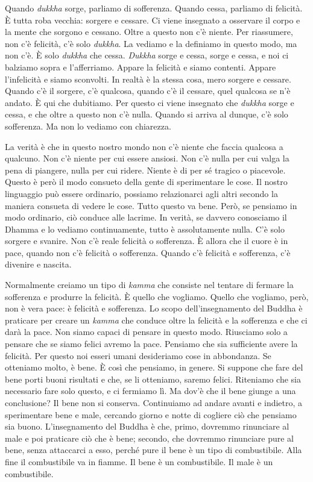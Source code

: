 Quando \emph{dukkha} sorge, parliamo di sofferenza. Quando cessa,
parliamo di felicità. È tutta roba vecchia: sorgere e cessare. Ci viene
insegnato a osservare il corpo e la mente che sorgono e cessano. Oltre a
questo non c'è niente. Per riassumere, non c'è felicità, c'è solo
\emph{dukkha}. La vediamo e la definiamo in questo modo, ma non c'è. È
solo \emph{dukkha} che cessa. \emph{Dukkha} sorge e cessa, sorge e
cessa, e noi ci balziamo sopra e l'afferriamo. Appare la felicità e
siamo contenti. Appare l'infelicità e siamo sconvolti. In realtà è la
stessa cosa, mero sorgere e cessare. Quando c'è il sorgere, c'è
qualcosa, quando c'è il cessare, quel qualcosa se n'è andato. È qui che
dubitiamo. Per questo ci viene insegnato che \emph{dukkha} sorge e
cessa, e che oltre a questo non c'è nulla. Quando si arriva al dunque,
c'è solo sofferenza. Ma non lo vediamo con chiarezza.

La verità è che in questo nostro mondo non c'è niente che faccia
qualcosa a qualcuno. Non c'è niente per cui essere ansiosi. Non c'è
nulla per cui valga la pena di piangere, nulla per cui ridere. Niente è
di per sé tragico o piacevole. Questo è però il modo consueto della
gente di sperimentare le cose. Il nostro linguaggio può essere
ordinario, possiamo relazionarci agli altri secondo la maniera consueta
di vedere le cose. Tutto questo va bene. Però, se pensiamo in modo
ordinario, ciò conduce alle lacrime. In verità, se davvero conosciamo il
Dhamma e lo vediamo continuamente, tutto è assolutamente nulla. C'è solo
sorgere e svanire. Non c'è reale felicità o sofferenza. È allora che il
cuore è in pace, quando non c'è felicità o sofferenza. Quando c'è
felicità e sofferenza, c'è divenire e nascita.

Normalmente creiamo un tipo di \emph{kamma} che consiste nel tentare di
fermare la sofferenza e produrre la felicità. È quello che vogliamo.
Quello che vogliamo, però, non è vera pace: è felicità e sofferenza. Lo
scopo dell'insegnamento del Buddha è praticare per creare un
\emph{kamma} che conduce oltre la felicità e la sofferenza e che ci darà
la pace. Non siamo capaci di pensare in questo modo. Riusciamo solo a
pensare che se siamo felici avremo la pace. Pensiamo che sia sufficiente
avere la felicità. Per questo noi esseri umani desideriamo cose in
abbondanza. Se otteniamo molto, è bene. È così che pensiamo, in genere.
Si suppone che fare del bene porti buoni risultati e che, se li
otteniamo, saremo felici. Riteniamo che sia necessario fare solo questo,
e ci fermiamo lì. Ma dov'è che il bene giunge a una conclusione? Il bene
non si conserva. Continuiamo ad andare avanti e indietro, a sperimentare
bene e male, cercando giorno e notte di cogliere ciò che pensiamo sia
buono. L'insegnamento del Buddha è che, primo, dovremmo rinunciare al
male e poi praticare ciò che è bene; secondo, che dovremmo rinunciare
pure al bene, senza attaccarci a esso, perché pure il bene è un tipo di
combustibile. Alla fine il combustibile va in fiamme. Il bene è un
combustibile. Il male è un combustibile.

